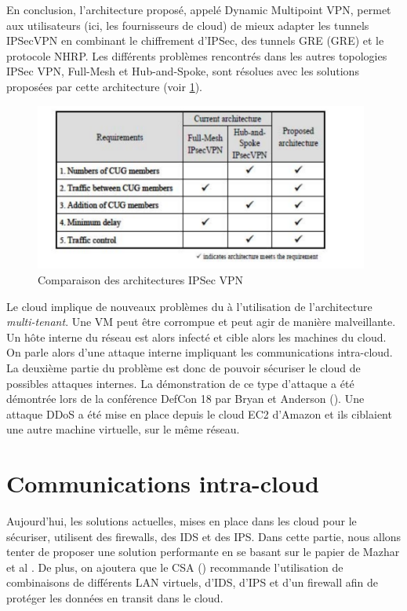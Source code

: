 En conclusion, l'architecture proposé, appelé Dynamic Multipoint VPN, permet aux utilisateurs (ici, les fournisseurs de cloud) de mieux adapter les tunnels IPSecVPN en combinant le chiffrement d'IPSec, des tunnels GRE (\gls{GRE}) et le protocole NHRP. Les différents problèmes rencontrés dans les autres topologies IPSec VPN, Full-Mesh et Hub-and-Spoke, sont résolues avec les solutions proposées par cette architecture (voir \ref{label-image8}).

\begin{figure}[h]
	\center
	\includegraphics[height=5.5cm]{./pics/comparative_archi_inter_cloud.png}
	\caption{Comparaison des architectures IPSec VPN \cite{archi_inter}}
	\label{label-image8}
\end{figure}

Le cloud implique de nouveaux problèmes du à l'utilisation de l'architecture \textit{multi-tenant}. Une VM peut être corrompue et peut agir de manière malveillante. Un hôte interne du réseau est alors infecté et cible alors les machines du cloud. On parle alors d'une attaque interne impliquant les communications intra-cloud.
La deuxième partie du problème est donc de pouvoir sécuriser le cloud de possibles attaques internes. La démonstration de ce type d'attaque a été démontrée lors de la conférence
DefCon 18 par Bryan et Anderson (\cite{faiblesse_cloud}). Une attaque DDoS a été mise en place depuis le cloud EC2 d'Amazon et ils ciblaient une autre machine virtuelle, sur le même réseau.

\section{Communications intra-cloud}\label{sec:intra_cloud}

Aujourd'hui, les solutions actuelles, mises en place dans les cloud pour le sécuriser, utilisent des firewalls, des IDS et des IPS. Dans cette partie, nous allons tenter de proposer une solution performante en se basant sur le papier de Mazhar et al \cite{security_cloud_survey}. De plus, on ajoutera que le CSA (\cite{security_guidelines}) recommande l'utilisation de combinaisons de différents \gls{LAN} virtuels, d'IDS, d'IPS et d'un firewall afin de protéger les données en transit dans le cloud. 

